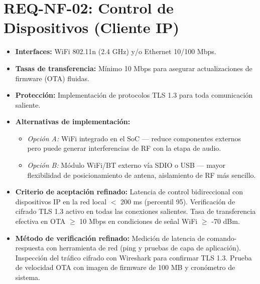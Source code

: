 \documentclass[%
	paper=a4,
	twoside=false,
	parskip=half,
	chapterprefix=false,
	10pt,
	headings=normal,
	bibliography=totoc,
	listof=totoc,
	titlepage=on,
	captions=tableabove,
	draft=false, 
]{scrbook}%
\begin{document}
\section{REQ-NF-02: Control de Dispositivos (Cliente IP)}
\begin{itemize}
    \item \textbf{Interfaces:} WiFi 802.11n (2.4 GHz) y/o Ethernet 10/100 Mbps.
    \item \textbf{Tasas de transferencia:} Mínimo 10 Mbps para asegurar actualizaciones de firmware (OTA) fluidas.
    \item \textbf{Protección:} Implementación de protocolos TLS 1.3 para toda comunicación saliente.
    \item \textbf{Alternativas de implementación:}
        \begin{itemize}
            \item \textit{Opción A:} WiFi integrado en el SoC — reduce componentes externos pero puede generar interferencias de RF con la etapa de audio.
            \item \textit{Opción B:} Módulo WiFi/BT externo vía SDIO o USB — mayor flexibilidad de posicionamiento de antena, aislamiento de RF más sencillo.
        \end{itemize}
    \item \textbf{Criterio de aceptación refinado:} Latencia de control bidireccional con dispositivos IP en la red local $<$ 200 ms (percentil 95). Verificación de cifrado TLS 1.3 activo en todas las conexiones salientes. Tasa de transferencia efectiva en OTA $\geq$ 10 Mbps en condiciones de señal WiFi $\geq$ -70 dBm.
    \item \textbf{Método de verificación refinado:} Medición de latencia de comando-respuesta con herramienta de red (ping y pruebas de capa de aplicación). Inspección del tráfico cifrado con Wireshark para confirmar TLS 1.3. Prueba de velocidad OTA con imagen de firmware de 100 MB y cronómetro de sistema.
\end{itemize}

\end{document}
